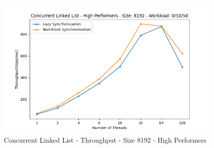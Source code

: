 \documentclass[../final_report.tex]{subfiles}
\begin{document}
\begin{figure}[H]
        \includegraphics[scale=0.4]{outFiles/plots/concurrent_data_structs_high_8192_0_50_50.png}
    \caption{Concurrent Linked List - Throughput - Size 8192 - High Performers}
    \label{fig:Concurrent Linked List - Throughput - Size 8192 - High Performers}
\end{figure}
\end{document}
